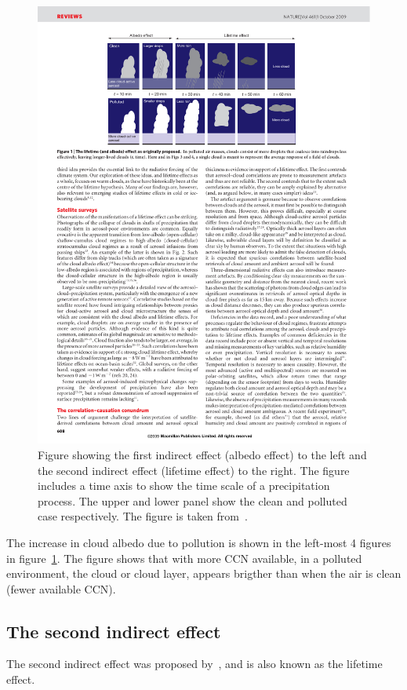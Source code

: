 \begin{figure}
\centering
\includegraphics[width=1.1\textwidth]{theory/indirecteffects.pdf}
\caption{Figure showing the first indirect effect (albedo effect) to the left and the second indirect effect (lifetime effect) to the right. The figure includes a time axis to show the time scale of a precipitation process. The upper and lower panel show the clean and polluted case respectively. The figure is taken from~\cite{Stevens2009}.}
\label{fig:indirecteffects}
\end{figure}

The increase in cloud albedo due to pollution is shown in the left-most 4 figures in figure~\ref{fig:indirecteffects}. The figure shows that with more CCN available, in a polluted environment, the cloud or cloud layer, appears brigther than when the air is clean (fewer available CCN).

\subsection{The second indirect effect}
The second indirect effect was proposed by~\citet{Albrecht1989}, and is also known as the lifetime effect.

